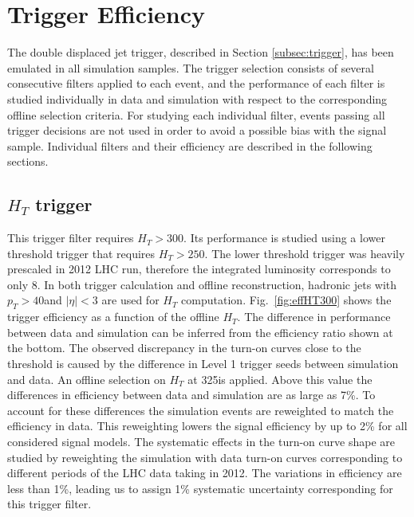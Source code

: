 \section{Trigger Efficiency}
\label{sec:trigeff}

The double displaced jet trigger, described
in Section \ref{subsec:trigger}, has been emulated in all
 simulation samples. The trigger selection consists of several consecutive filters applied to each event, 
and the performance of each filter is studied individually in data and simulation with respect to 
the corresponding offline selection criteria. For studying each individual filter, events 
passing all trigger decisions 
are not used in order to avoid a possible bias with the signal sample. Individual filters and their efficiency are
described in the following sections.  

\subsection{$H_T$ trigger}
\label{subsec:trigHT}
This trigger filter requires $H_T > 300$\GeV. Its performance is studied using a lower threshold trigger that 
requires $H_T >250$\GeV. 
The lower threshold trigger was heavily prescaled in 2012 LHC run, therefore the integrated luminosity corresponds to only 8\pbinv. 
In both trigger calculation and offline reconstruction, hadronic jets with $p_T>40$\GeV and $|\eta|<3$ are used
 for $H_T$ computation. 
Fig.~\ref{fig:effHT300} shows the trigger efficiency as a function of the offline $H_T$. 
The difference in performance between data and simulation can be inferred from the efficiency ratio 
shown at the bottom. The observed discrepancy in the turn-on curves close to the threshold is caused by the 
difference in Level 1 trigger seeds between simulation and data.
An offline selection on 
$H_T$ at 325\GeV is applied. 
Above this value the differences in efficiency between data and simulation are as large as
7\%. To account for these differences the simulation events are reweighted to match the efficiency in data.
This reweighting
lowers the signal efficiency by up to 2\% for all considered signal models. The systematic effects in the turn-on
curve shape are studied by reweighting the simulation with data turn-on curves corresponding to
 different periods of the LHC data taking in 2012. The variations in efficiency are 
less than 1\%, leading us to assign 1\% 
systematic uncertainty corresponding for this trigger filter.      

